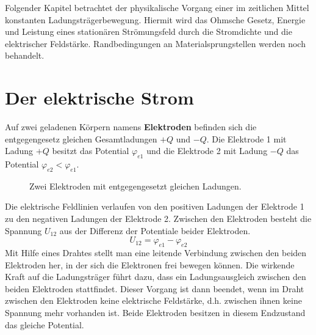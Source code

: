 Folgender Kapitel betrachtet der physikalische Vorgang  einer im zeitlichen Mittel konstanten Ladungsträgerbewegung. Hiermit wird das Ohmsche Gesetz, Energie und Leistung eines stationären Strömungsfeld durch die Stromdichte und die elektrischer Feldstärke. Randbedingungen an Materialsprungstellen werden noch behandelt.
\section{Der elektrische Strom}
Auf zwei geladenen Körpern namens \textbf{Elektroden} befinden sich die entgegengesetz gleichen Gesamtladungen $+Q$ und $-Q$. Die Elektrode 1 mit Ladung $+Q$ besitzt das Potential $\varphi_{e1}$ und die Elektrode 2 mit Ladung $-Q$ das Potential $\varphi_{e2}<\varphi_{e1}$.
\begin{figure}[H]
\centering
\caption{Zwei Elektroden mit entgegengesetzt gleichen Ladungen.}
\label{fig_IIa}
\end{figure}
\noindent Die elektrische Feldlinien verlaufen von den positiven Ladungen der Elektrode 1 zu den negativen Ladungen der Elektrode 2. Zwischen den Elektroden besteht die Spannung $U_{12}$ aus der Differenz der Potentiale beider Elektroden.
\begin{equation}
\boxed{U_{12}=\varphi_{e1}-\varphi_{e2}}
\end{equation}
Mit Hilfe eines Drahtes stellt man eine leitende Verbindung zwischen den beiden Elektroden her, in der sich die Elektronen frei bewegen können. Die wirkende Kraft auf die Ladungsträger führt dazu, dass ein Ladungsausgleich zwischen den beiden Elektroden stattfindet. Dieser Vorgang ist dann beendet, wenn im Draht zwischen den Elektroden keine elektrische Feldstärke, d.h. zwischen ihnen keine Spannung mehr vorhanden ist. Beide Elektroden besitzen in diesem Endzustand das gleiche Potential.

